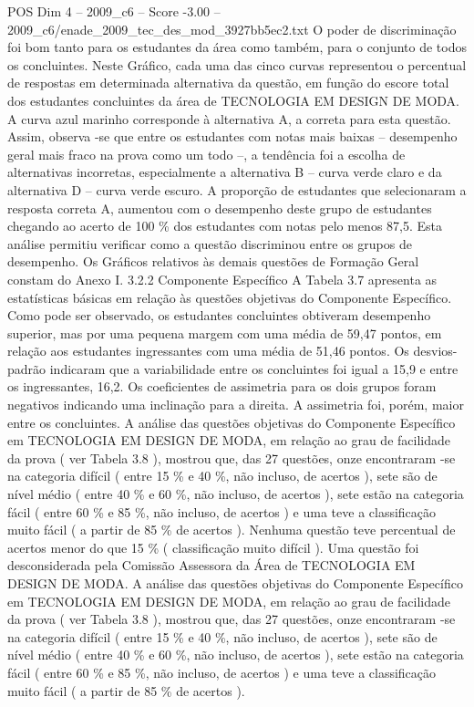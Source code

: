 \begin{textsample}{POS Dim 4 – 2009\_c6 – Score -3.00 – 2009\_c6/enade\_2009\_tec\_des\_mod\_3927bb5ec2.txt}
O poder de discriminação foi bom tanto para os estudantes da área como também, para o conjunto de todos os concluintes.
Neste Gráfico, cada uma das cinco curvas representou o percentual de respostas em determinada alternativa da questão, em função do escore total dos estudantes concluintes da área de TECNOLOGIA EM DESIGN DE MODA.
A curva azul marinho corresponde à alternativa A, a correta para esta questão.
Assim, observa -se que entre os estudantes com notas mais baixas – desempenho geral mais fraco na prova como um todo –, a tendência foi a escolha de alternativas incorretas, especialmente a alternativa B – curva verde claro e da alternativa D – curva verde escuro.
A proporção de estudantes que selecionaram a resposta correta A, aumentou com o desempenho deste grupo de estudantes chegando ao acerto de 100 \% dos estudantes com notas pelo menos 87,5.
Esta análise permitiu verificar como a questão discriminou entre os grupos de desempenho.
Os Gráficos relativos às demais questões de Formação Geral constam do Anexo I. 3.2.2 Componente Específico A Tabela 3.7 apresenta as estatísticas básicas em relação às questões objetivas do Componente Específico.
Como pode ser observado, os estudantes concluintes obtiveram desempenho superior, mas por uma pequena margem com uma média de 59,47 pontos, em relação aos estudantes ingressantes com uma média de 51,46 pontos.
Os desvios-padrão indicaram que a variabilidade entre os concluintes foi igual a 15,9 e entre os ingressantes, 16,2.
Os coeficientes de assimetria para os dois grupos foram negativos indicando uma inclinação para a direita.
A assimetria foi, porém, maior entre os concluintes.
A análise das questões objetivas do Componente Específico em TECNOLOGIA EM DESIGN DE MODA, em relação ao grau de facilidade da prova ( ver Tabela 3.8 ), mostrou que, das 27 questões, onze encontraram -se na categoria difícil ( entre 15 \% e 40 \%, não incluso, de acertos ), sete são de nível médio ( entre 40 \% e 60 \%, não incluso, de acertos ), sete estão na categoria fácil ( entre 60 \% e 85 \%, não incluso, de acertos ) e uma teve a classificação muito fácil ( a partir de 85 \% de acertos ).
Nenhuma questão teve percentual de acertos menor do que 15 \% ( classificação muito difícil ).
Uma questão foi desconsiderada pela Comissão Assessora da Área de TECNOLOGIA EM DESIGN DE MODA.
A análise das questões objetivas do Componente Específico em TECNOLOGIA EM DESIGN DE MODA, em relação ao grau de facilidade da prova ( ver Tabela 3.8 ), mostrou que, das 27 questões, onze encontraram -se na categoria difícil ( entre 15 \% e 40 \%, não incluso, de acertos ), sete são de nível médio ( entre 40 \% e 60 \%, não incluso, de acertos ), sete estão na categoria fácil ( entre 60 \% e 85 \%, não incluso, de acertos ) e uma teve a classificação muito fácil ( a partir de 85 \% de acertos ).

\end{textsample}
